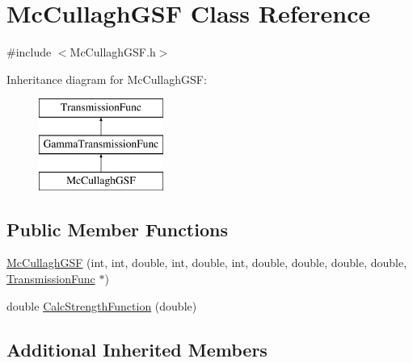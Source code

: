 \hypertarget{classMcCullaghGSF}{\section{Mc\-Cullagh\-G\-S\-F Class Reference}
\label{classMcCullaghGSF}
}


{\ttfamily \#include $<$Mc\-Cullagh\-G\-S\-F.\-h$>$}

Inheritance diagram for Mc\-Cullagh\-G\-S\-F\-:\begin{figure}[H]
\begin{center}
\leavevmode
\includegraphics[height=3.000000cm]{da/d68/classMcCullaghGSF}
\end{center}
\end{figure}
\subsection*{Public Member Functions}
\begin{DoxyCompactItemize}
\item 
\hyperlink{classMcCullaghGSF_a4bdf71c12c6728bbeb4eff21fb7d0217}{Mc\-Cullagh\-G\-S\-F} (int, int, double, int, double, int, double, double, double, double, \hyperlink{classTransmissionFunc}{Transmission\-Func} $\ast$)
\item 
double \hyperlink{classMcCullaghGSF_ae386ec5251054a5f3a96ee19501bff58}{Calc\-Strength\-Function} (double)
\end{DoxyCompactItemize}
\subsection*{Additional Inherited Members}


